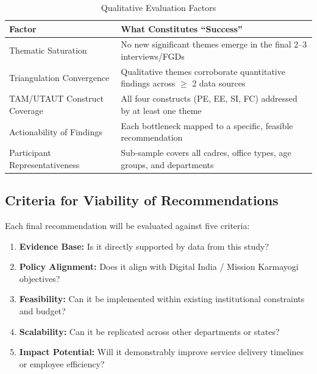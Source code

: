 \documentclass[12pt,a4paper]{article}
\begin{document}
\begin{table}[H]
\centering
\caption{Qualitative Evaluation Factors}
\small
\begin{tabularx}{\textwidth}{L{4cm} X}
\toprule
\textbf{Factor} & \textbf{What Constitutes ``Success''} \\
\midrule
Thematic Saturation & No new significant themes emerge in the final 2--3 interviews/FGDs \\[4pt]
Triangulation Convergence & Qualitative themes corroborate quantitative findings across $\geq$ 2 data sources \\[4pt]
TAM/UTAUT Construct Coverage & All four constructs (PE, EE, SI, FC) addressed by at least one theme \\[4pt]
Actionability of Findings & Each bottleneck mapped to a specific, feasible recommendation \\[4pt]
Participant Representativeness & Sub-sample covers all cadres, office types, age groups, and departments \\
\bottomrule
\end{tabularx}
\end{table}

\subsection{Criteria for Viability of Recommendations}

Each final recommendation will be evaluated against five criteria:

\begin{enumerate}[leftmargin=1.5em, itemsep=4pt]
    \item \textbf{Evidence Base:} Is it directly supported by data from this study?
    \item \textbf{Policy Alignment:} Does it align with Digital India / Mission Karmayogi objectives?
    \item \textbf{Feasibility:} Can it be implemented within existing institutional constraints and budget?
    \item \textbf{Scalability:} Can it be replicated across other departments or states?
    \item \textbf{Impact Potential:} Will it demonstrably improve service delivery timelines or employee efficiency?
\end{enumerate}

\newpage

\end{document}
